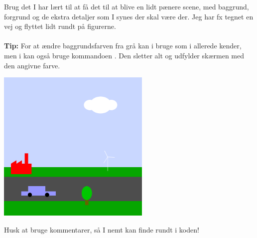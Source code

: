 \documentclass{ucph-handout}
\begin{document}
\begin{exercisebox}[adjusted title=Green City]

Brug det I har lært til at få det til at blive en lidt pænere scene, med baggrund, forgrund og de ekstra detaljer som I synes der skal være der. Jeg har fx tegnet en vej og flyttet lidt rundt på figurerne. 
\\
\\
\textbf{Tip: }For at ændre baggrundsfarven fra grå  kan i bruge  som i
allerede kender, men i kan også bruge kommandoen .
Den sletter alt og udfylder skærmen med den angivne farve.

\begin{center}
\includegraphics[width=0.55\textwidth]{illustrationer/elbil.png}
\end{center}

\noindent
Husk at bruge kommentarer, så I nemt kan finde rundt i koden!
\end{exercisebox}

\end{document}
